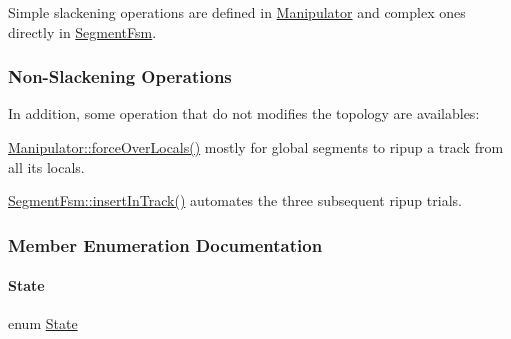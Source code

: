 Simple slackening operations are defined in \hyperlink{classKite_1_1Manipulator}{Manipulator} and complex ones directly in \hyperlink{classKite_1_1SegmentFsm}{Segment\+Fsm}.\hypertarget{classKite_1_1SegmentFsm_secNonSlackening}{}\subsubsection{Non-\/\+Slackening Operations}\label{classKite_1_1SegmentFsm_secNonSlackening}
In addition, some operation that do not modifies the topology are availables\+:
\begin{DoxyEnumerate}
\item \hyperlink{classKite_1_1Manipulator_add26b688d75a99a1ae781787eead08d5}{Manipulator\+::force\+Over\+Locals()} mostly for global segments to ripup a track from all it\textquotesingle{}s locals.
\item \hyperlink{classKite_1_1SegmentFsm_a7140b507da2cab137d968a037bed19df}{Segment\+Fsm\+::insert\+In\+Track()} automates the three subsequent ripup trials. 
\end{DoxyEnumerate}

\subsubsection{Member Enumeration Documentation}
\mbox{\label{classKite_1_1SegmentFsm_a5d74787dedbc4e11c1ab15bf487e61f8}} 
\paragraph{\texorpdfstring{State}{State}}
{\footnotesize\ttfamily enum \hyperlink{classKite_1_1SegmentFsm_a5d74787dedbc4e11c1ab15bf487e61f8}{State}}


